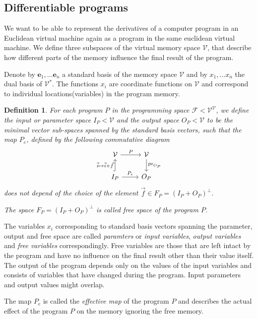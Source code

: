 \documentclass[smallcondensed]{svjour3}
\newcommand{\VV}{\mathcal{V}}
\newcommand{\e}{\mathbf{e}}
\newcommand{\F}{\mathcal{F}}
\newtheorem{definicija}{Definition}[section]
\begin{document}
\subsection{Differentiable programs}
We want to be able to represent the derivatives of a computer program in an
Euclidean virtual machine again as a program in the same euclidean virtual
machine. We define three subspaces of the virtual memory space $\VV$, that
describe how different parts of the memory influence the final result of the
program.   

Denote by $\e_1,\ldots \e_n$ a standard basis of the memory space $\VV$ and by
$x_1,\ldots x_n$ the dual basis of $\VV^*$. The functions $x_i$ are coordinate
functions on $\VV$ and correspond to individual locations(variables) in the
program memory.

\begin{definicija}
  For each program $P$ in the programming space $\F<\VV^\VV$,
  we define the \emph{input} or \emph{parameter space} $I_P<\VV$ and the
  \emph{output space} $O_P<\VV$ to be the minimal vector sub-spaces spanned by
  the standard basis vectors, such that the map $P_e$, defined by the following
  commutative diagram 
\begin{equation} 
    \label{eq:induced_map}
\begin{tikzcd}
  \VV \arrow{r}{P} & 
  \VV \arrow{d}{\mathrm{pr}_{O_P}}\\
  I_P \arrow[hook]{u}{\vec{i}\mapsto \vec{i}+\vec{f}} 
  \arrow{r}{P_e}& O_P
\end{tikzcd}
  \end{equation}
does not depend of the choice of the element 
$\vec{f}\in F_P=(I_P+O_P)^\perp$.

The space $F_P=(I_P+O_P)^\perp$ is called \emph{free space} of the program $P$.
\end{definicija}

The variables $x_i$ corresponding to standard
basis vectors spanning the parameter, output and free space are called
\emph{paramters} or \emph{input variables}, \emph{output variables} and
\emph{free variables} correspondingly. Free variables are those that are
left intact by the program and have no influence on the final result other than
their value itself. The output of the program depends only on the values
of the input variables and consists of variables that have changed during
the program. Input parameters and output values might overlap. 

The map $P_e$ is called the \emph{effective map} of the program $P$ and
describes the actual effect of the program $P$ on the memory
ignoring the free memory. 
\end{document}
